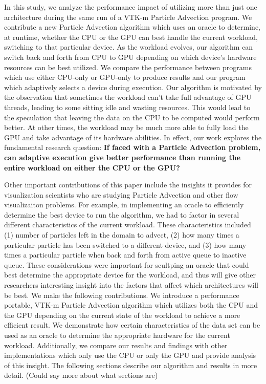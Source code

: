 \documentclass{IEEEtran}
\begin{document}
%
In this study, we analyze the performance impact of utilizing more than just one architecture during the same run of a VTK-m Particle Advection program.
%
We contribute a new Particle Advection algorithm which uses an oracle to determine, at runtime, whether the CPU or the GPU can best handle the current workload, switching to that particular device.
%
As the workload evolves, our algorithm can switch back and forth from CPU to GPU depending on which device's hardware resources can be best utilized.
%
We compare the performance between programs which use either CPU-only or GPU-only to produce results and our program which adaptively selects a device during execution. 
%
Our algorithm is motivated by the observation that sometimes the workload can't take full advantage of GPU threads, leading to some sitting idle and wasting resources.
%
This would lead to the speculation that leaving the data on the CPU to be computed would perform better.
%
At other times, the workload may be much more able to fully load the GPU and take advantage of its hardware abilities.
%
In effect, our work explores the fundamental research question: \textbf{If faced with a Particle Advection problem, can adaptive execution give better performance than running the entire workload on either the CPU or the GPU?}

%
Other important contributions of this paper include the insights it provides for visualization scientists who are studying Particle Advection and other flow visualizaiton problems.
%
For example, in implementing an oracle to efficiently determine the best device to run the algorithm, we had to factor in several different characteristics of the current workload.
%
These characteristics included (1) number of particles left in the domain to advect, (2) how many times a particular particle has been switched to a different device, and (3) how many times a particular particle when back and forth from active queue to inactive queue.
%
These considerations were important for scultping an oracle that could best determine the appropriate device for the workload, and thus will give other researchers interesting insight into the factors that affect which architectures will be best.
%
We make the following contributions.
%
We introduce a performance portable, VTK-m Particle Advection algorithm which utilizes both the CPU and the GPU depending on the current state of the workload to achieve a more efficient result.
%
We demonstrate how certain characteristics of the data set can be used as an oracle to determine the appropriate hardware for the current workload.
%
Additionally, we compare our results and findings with other implementations which only use the CPU or only the GPU and provide analysis of this insight.
%
The following sections describe our algorithm and results in more detail. 
%
(Could say more about what sections are)
%
\end{document}
